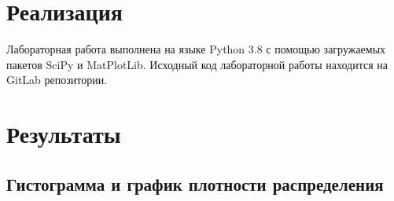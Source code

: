 \documentclass[12pt,a4paper]{article}
\begin{document}
	\section{Реализация}
	Лабораторная работа выполнена на языке Python 3.8 с помощью загружаемых пакетов SciPy и MatPlotLib. Исходный код лабораторной работы находится на GitLab репозитории.
	\newpage
	
	\section{Результаты}
	\subsection{Гистограмма и график плотности распределения}
	
\end{document}
